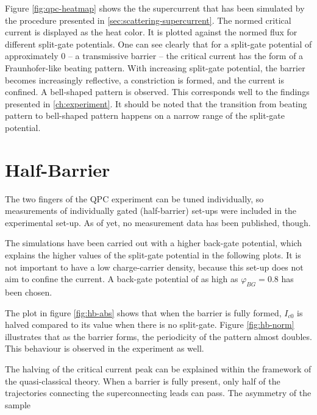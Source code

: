 Figure \ref{fig:qpc-heatmap} shows the the supercurrent that has been simulated by the procedure presented in \ref{sec:scattering-supercurrent}. The normed critical current is displayed as the heat color. It is plotted against the normed flux for different split-gate potentials. One can see clearly that for a split-gate potential of approximately 0 -- a transmissive barrier -- the critical current has the form of a Fraunhofer-like beating pattern. With increasing split-gate potential, the barrier becomes increasingly reflective, a constriction is formed, and the current is confined. A bell-shaped pattern is observed. This corresponds well to the findings presented in \ref{ch:experiment}. It should be noted that the transition from beating pattern to bell-shaped pattern happens on a narrow range of the split-gate potential.

\section{Half-Barrier}
The two fingers of the QPC experiment can be tuned individually, so measurements of individually gated (half-barrier) set-ups  were included in the experimental set-up. As of yet, no measurement data has been published, though.

The simulations have been carried out with a higher back-gate potential, which explains the higher values of the split-gate potential in the following plots. It is not important to have a low charge-carrier density, because this set-up does not aim to confine the current. A back-gate potential of as high as $\varphi_{BG} = 0.8$ has been chosen.

The plot in figure \ref{fig:hb-abs} shows that when the barrier is fully formed, $I_{c0}$ is halved compared to its value when there is no split-gate. Figure \ref{fig:hb-norm} illustrates that as the barrier forms, the periodicity of the pattern almost doubles. This behaviour is observed in the experiment as well.

The halving of the critical current peak can be explained within the framework of the quasi-classical theory. When a barrier is fully present, only half of the trajectories connecting the superconnecting leads can pass. The asymmetry of the sample 

